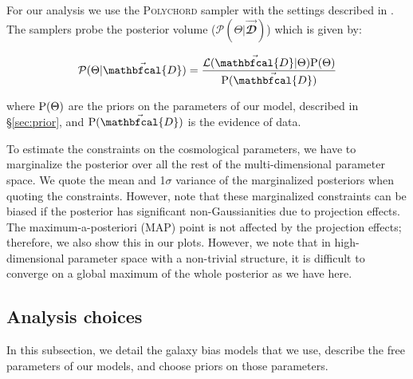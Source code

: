 \documentclass[aps, prd,twocolumn,superscriptaddress,nofootinbib,preprintnumbers]{revtex4-1}
\begin{document}
For our analysis we use the \textsc{Polychord} sampler with the settings described in \cite{y3-samplers}. The samplers probe the posterior volume ($\mathcal{P}(\Theta | \vec{\mathbfcal{D}})$) which is given by:
\begin{linenomath*}
\begin{equation}
    \mathcal{P}(\Theta | \vec{\mathbfcal{D}}) = \frac{\mathcal{L}(\vec{\mathbfcal{D}}|\Theta) {\rm P}(\Theta)}{{\rm P}(\vec{\mathbfcal{D}})}
\end{equation}
\end{linenomath*}
where ${\rm P}(\Theta)$ are the priors on the parameters of our model, described in \S\ref{sec:prior}, and ${\rm P}(\vec{\mathbfcal{D}})$ is the evidence of data. 

To estimate the constraints on the cosmological parameters, we have to marginalize the posterior over all the rest of the multi-dimensional parameter space. We quote the mean and 1$\sigma$ variance of the marginalized posteriors when quoting the constraints. However, note that these marginalized constraints can be biased if the posterior has significant non-Gaussianities due to projection effects. The maximum-a-posteriori (MAP) point is not affected by the projection effects; therefore, we also show this in our plots. However, we note that in high-dimensional parameter space with a non-trivial structure, it is difficult to converge on a global maximum of the whole posterior as we have here.


\subsection{Analysis choices}
\label{sec:analysis_choices}
In this subsection, we detail the galaxy bias models that we use, describe the free parameters of our models, and choose priors on those parameters. 
\end{document}
